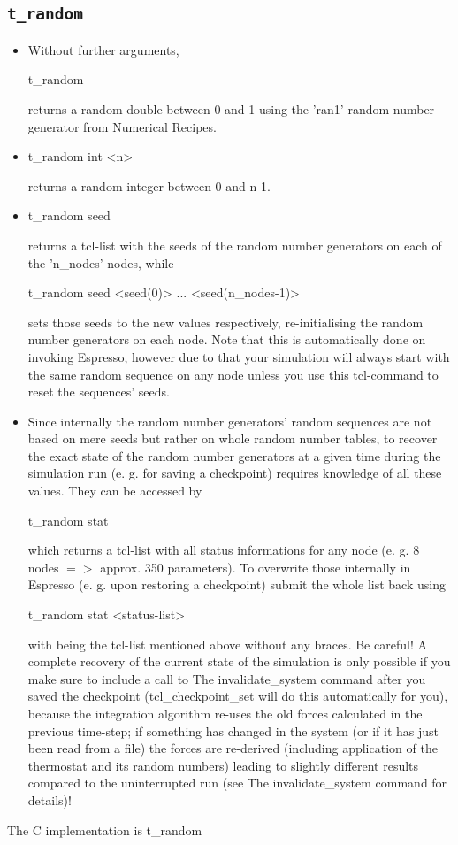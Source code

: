 \subsection{\texttt{t\_random}}
\begin{itemize}
 \item
   Without further arguments,
\begin{code}
t\_random
\end{code}
returns a random double between 0 and 1 using the 'ran1' random number
generator from Numerical Recipes.
 \item
\begin{code}
t\_random int <n>
\end{code}
  returns a random integer between 0 and n-1.
 \item
\begin{code}
t\_random seed
\end{code}
returns a tcl-list with the seeds of the random number generators on
each of the 'n\_nodes' nodes, while
\begin{code}
t\_random seed <seed(0)> ... <seed(n\_nodes-1)>
\end{code}
sets those seeds to the new values respectively, re-initialising the
random number generators on each node.  Note that this is
automatically done on invoking Espresso, however due to that your
simulation will always start with the same random sequence on any node
unless you use this tcl-command to reset the sequences' seeds.
\item Since internally the random number generators' random sequences
  are not based on mere seeds but rather on whole random number
  tables, to recover the exact state of the random number generators
  at a given time during the simulation run (e. g. for saving a
  checkpoint) requires knowledge of all these values. They can be
  accessed by
\begin{code}
t\_random stat
\end{code}
which returns a tcl-list with all status informations for any node (e.
g. 8 nodes $=>$ approx. 350 parameters). To overwrite those internally
in Espresso (e. g. upon restoring a checkpoint) submit the whole list
back using
\begin{code}
t\_random stat <status-list>
\end{code}
with  being the tcl-list mentioned above without any
braces.  Be careful! A complete recovery of the current state of the
simulation is only possible if you make sure to include a call to The
invalidate\_system command after you saved the checkpoint
(tcl\_checkpoint\_set will do this automatically for you), because the
integration algorithm re-uses the old forces calculated in the
previous time-step; if something has changed in the system (or if it
has just been read from a file) the forces are re-derived (including
application of the thermostat and its random numbers) leading to
slightly different results compared to the uninterrupted run (see The
invalidate\_system command for details)!
\end{itemize}
The C implementation is t\_random

